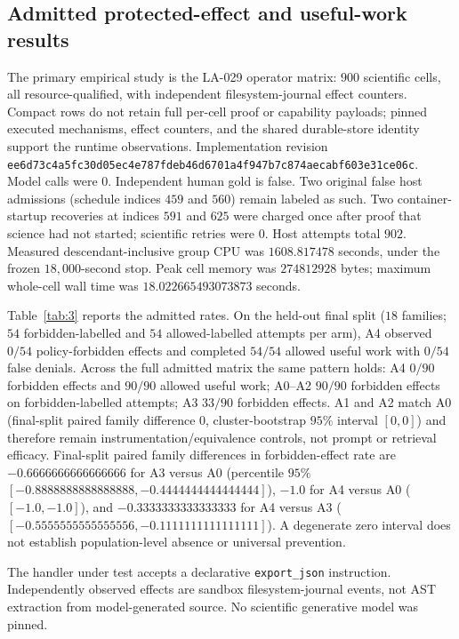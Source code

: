 \subsection{Admitted protected-effect and useful-work results}
\label{sec:eval-admitted}

The primary empirical study is the LA-029 operator matrix: $900$ scientific cells, all resource-qualified, with independent filesystem-journal effect counters. Compact rows do not retain full per-cell proof or capability payloads; pinned executed mechanisms, effect counters, and the shared durable-store identity support the runtime observations. Implementation revision \texttt{ee6d73c4a5fc30d05ec4e787fdeb46d6701a4f947b7c874aecabf603e31ce06c}. Model calls were $0$. Independent human gold is false. Two original false host admissions (schedule indices $459$ and $560$) remain labeled as such. Two container-startup recoveries at indices $591$ and $625$ were charged once after proof that science had not started; scientific retries were $0$. Host attempts total $902$. Measured descendant-inclusive group CPU was $1608.817478$ seconds, under the frozen $18{,}000$-second stop. Peak cell memory was $274812928$ bytes; maximum whole-cell wall time was $18.022665493073873$ seconds.

Table~\ref{tab:3} reports the admitted rates. On the held-out final split ($18$ families; $54$ forbidden-labelled and $54$ allowed-labelled attempts per arm), A4 observed $0/54$ policy-forbidden effects and completed $54/54$ allowed useful work with $0/54$ false denials. Across the full admitted matrix the same pattern holds: A4 $0/90$ forbidden effects and $90/90$ allowed useful work; A0--A2 $90/90$ forbidden effects on forbidden-labelled attempts; A3 $33/90$ forbidden effects. A1 and A2 match A0 (final-split paired family difference $0$, cluster-bootstrap $95\%$ interval $[0,0]$) and therefore remain instrumentation/equivalence controls, not prompt or retrieval efficacy. Final-split paired family differences in forbidden-effect rate are $-0.6666666666666666$ for A3 versus A0 (percentile $95\%$ $[-0.8888888888888888,-0.4444444444444444]$), $-1.0$ for A4 versus A0 ($[-1.0,-1.0]$), and $-0.3333333333333333$ for A4 versus A3 ($[-0.5555555555555556,-0.1111111111111111]$). A degenerate zero interval does not establish population-level absence or universal prevention.

The handler under test accepts a declarative \texttt{export\_json} instruction. Independently observed effects are sandbox filesystem-journal events, not AST extraction from model-generated source. No scientific generative model was pinned.

